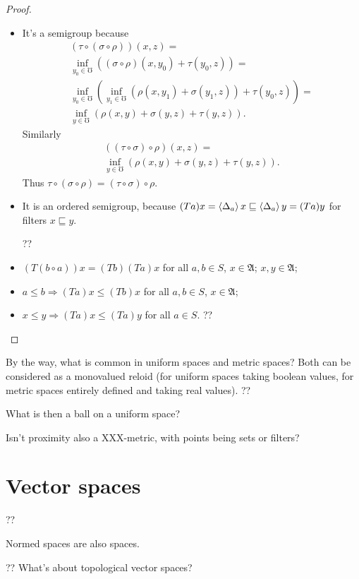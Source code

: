 \begin{proof}
~
\begin{itemize}
\item It's a semigroup because
\begin{multline*}
(\tau\circ(\sigma\circ\rho))(x,z) = \\
\inf_{y_0\in\mho}((\sigma\circ\rho)(x,y_0)+\tau(y_0,z)) = \\
\inf_{y_0\in\mho}(\inf_{y_1\in\mho}(\rho(x,y_1)+\sigma(y_1,z))+\tau(y_0,z)) = \\
\inf_{y\in\mho}(\rho(x,y)+\sigma(y,z)+\tau(y,z)).
\end{multline*}
Similarly 
\begin{multline*}
((\tau\circ\sigma)\circ\rho)(x,z) = \\
\inf_{y\in\mho}(\rho(x,y)+\sigma(y,z)+\tau(y,z)).
\end{multline*}
Thus $\tau\circ(\sigma\circ\rho)=(\tau\circ\sigma)\circ\rho$.

\item It is an ordered semigroup, because
$(Ta)x = \left\langle \Delta_a\right\rangle x \sqsubseteq \left\langle \Delta_a\right\rangle y = (Ta)y$ 
for filters $x\sqsubseteq y$.

??

\item $(T(b\circ a))x = (Tb)(Ta)x$ for all $a,b\in S$, $x\in\mathfrak{A}$;
$x,y\in\mathfrak{A}$;
\item $a\leq b\Rightarrow(Ta)x\leq (Tb)x$ for all $a,b\in S$, $x\in\mathfrak{A}$;
\item $x\leq y\Rightarrow(Ta)x\leq (Ta)y$ for all $a\in S$. ??
\end{itemize}
\end{proof}

By the way, what is common in uniform spaces and metric spaces? Both can be considered as a monovalued reloid (for uniform spaces taking boolean values, for metric spaces entirely defined and taking real values). ??

What is then a ball on a uniform space?

Isn't proximity also a XXX-metric, with points being sets or filters?

\section{Vector spaces}

??

Normed spaces are also spaces.

?? What's about topological vector spaces?
